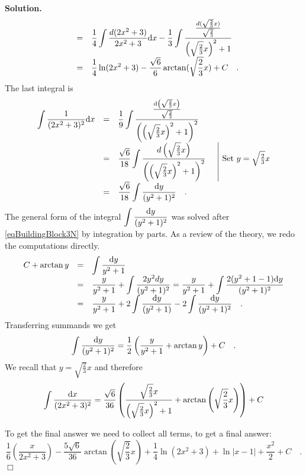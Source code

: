 \documentclass[12pt]{book}
\newenvironment{solution}{\medskip\noindent\textbf{Solution.} }{$\Box$}
\begin{document}
\begin{solution}
\[\begin{array}{rcl}
&=&\displaystyle  \frac{1}{4} \int \frac{d(2x^2+3)}{2x^2+3}{\normalfont \text{d}} x- \frac{1}{3}\int \frac{\frac{d (\sqrt{\frac23}x)} {\sqrt{\frac23}}} {\left( \sqrt{\frac23}x\right)^2+1} \\
&=&\displaystyle   \frac{1}{4}\ln (2x^2+3)-\frac{\sqrt{6}}{6}\arctan (\sqrt{\frac23}x)+C
\quad .
\end{array}
\]
The last integral is
\[
\begin{array}{rcll|l}
\displaystyle \int \frac{1}{(2x^2+3)^2}{\normalfont \text{d}} x&=&\displaystyle  \frac{1}{9} \int \frac{\frac{{\normalfont \text{d}}\left(\sqrt{\frac{2}{3}}x\right)}{\sqrt{\frac23}}}{\left(\left(\sqrt{\frac23}x\right)^2+1\right)^2}\\
&=&\displaystyle  \frac{\sqrt{6}}{18}\int \frac{d\left(\sqrt{\frac23}x\right)}{\left(\left(\sqrt{\frac23}x\right)^2+1\right)^2} &&\text{Set }y=\sqrt{\frac23}x\\
&=&\displaystyle  \frac{\sqrt{6}}{18}\int \frac{{\normalfont \text{d}} y}{(y^2+1)^2}\quad.
\end{array}
\]
The general form of the integral $\displaystyle\int \frac{{\normalfont \text{d}} y}{(y^2+1)^2}$ was solved after \eqref{eqBuildingBlock3N} by integration by parts. As a review of the theory, we redo the computations directly.
\[
\begin{array}{rcl}
C+\arctan y &=&\displaystyle \int \frac{{\normalfont \text{d}} y}{y^2+1}\\
&=&\displaystyle \frac{y}{y^2+1} +\int \frac{2y^2dy }{( y^2+ 1 )^2}= \frac{y}{y^2+1}+\int \frac{2(y^2+1-1){\normalfont \text{d}} y}{(y^2+1)^2}\\
&=&\displaystyle \frac{y}{y^2+1} + 2\int \frac{{\normalfont \text{d}} y}{ ( y^2 +1)}- 2\int \frac{{\normalfont \text{d}} y}{(y^2+1)^2}\quad.
\end{array}
\]
Transferring summands we get
\[
\int \frac{{\normalfont \text{d}} y}{(y^2+1)^2}= \frac{1}{2} \left( \frac{ y }{y^2+1} +\arctan y\right) +C\quad .
\]
We recall that $y=\sqrt{\frac{2}{3}}x$ and therefore
\[
\int \frac{{\normalfont \text{d}} x}{(2x^2+3)^2}=\frac{\sqrt{6}}{36}\left(\frac{\sqrt{\frac{2}{3}}x}{\left(\sqrt{\frac{2}{3}}x\right)^2+1}+\arctan \left( \sqrt{\frac{2}{3}}x\right)\right) +C
\]

To get the final answer we need to collect all terms, to get a final answer:
\[
\frac{1}{6}\left(\frac{x}{2x^2+3}\right) - \frac{5\sqrt{6}}{36} \arctan \left(\sqrt{\frac{2}{3}}x \right) +\frac{1}{4} \ln (2x^2+3) +\ln|x-1|+\frac{x ^2 } 2+ C\quad .
\]
\end{solution}
\end{document}
